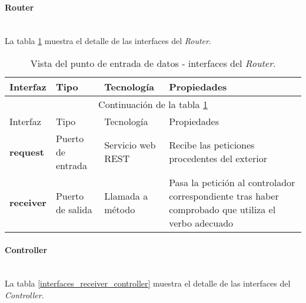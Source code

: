  
 \paragraph{Router} \hfill \\
 La tabla \ref{interfaces_receiver_router} muestra el detalle de las interfaces del \textit{Router}.
 \begin{longtable}[c]{|p{25mm}|p{20mm}|p{30mm}|p{60mm}|}
  \caption{Vista del punto de entrada de datos - interfaces del \textit{Router}.\label{interfaces_receiver_router}}\\
 
  \hline
  	Interfaz & Tipo & Tecnología & Propiedades\\
  \hline
  \hline
  \endfirsthead
  \hline
  \multicolumn{4}{|c|}{Continuación de la tabla \ref{interfaces_receiver_router}}\\
  \hline
  	Interfaz & Tipo & Tecnología & Propiedades\\
  \hline
  \hline
  \endhead
  \hline
  \endfoot
  
 	\textbf{request} & Puerto de entrada & Servicio web REST & Recibe las peticiones procedentes del exterior \\
 	\hline
 	
 	\textbf{receiver} & Puerto de salida & Llamada a método & Pasa la petición al controlador correspondiente tras haber comprobado que utiliza el verbo adecuado \\
 \hline
 \hline
 
  \end{longtable}
  
\paragraph{Controller} \hfill \\
La tabla \ref{interfaces_receiver_controller} muestra el detalle de las interfaces del \textit{Controller}.

